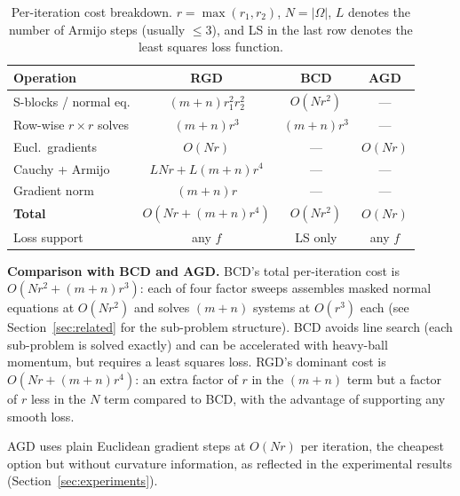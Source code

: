 \documentclass[letterpaper, 10 pt, conference]{ieeeconf}
\theoremstyle{plain}
\theoremstyle{definition}
\theoremstyle{remark}
\begin{document}
\begin{table}[t]
\centering
\caption{Per-iteration cost breakdown.  $r = \max(r_1,r_2)$, $N = |\Omega|$, $L$ denotes the number of Armijo steps (usually ${\leq}3$), and LS in the last row denotes the least squares loss function.
}
\label{tab:complexity}
\small
\begin{tabular}{@{}lccc@{}}
\toprule
Operation & RGD & BCD & AGD \\
\midrule
S-blocks / normal eq. & $(m{+}n)r_1^2 r_2^2$ & $O(Nr^2)$ & --- \\
Row-wise $r{\times}r$ solves & $(m{+}n)r^3$ & $(m{+}n)r^3$ & --- \\
Eucl.\ gradients & $O(Nr)$ & --- & $O(Nr)$ \\
Cauchy + Armijo & $LNr {+} L(m{+}n)r^4$ & --- & --- \\
Gradient norm & $(m{+}n)r$ & --- & --- \\
\midrule
\textbf{Total} & $O(Nr {+} (m{+}n)r^4)$ & $O(Nr^2)$ & $O(Nr)$ \\
\midrule
Loss support & any $f$ & LS only & any $f$ \\
\bottomrule
\end{tabular}
\end{table}



\noindent\textbf{Comparison with BCD and AGD.}
BCD's total per-iteration cost is $O(Nr^2 + (m{+}n)r^3)$: each of four factor sweeps assembles masked normal equations at $O(Nr^2)$ and solves $(m{+}n)$ systems at $O(r^3)$ each (see Section~\ref{sec:related} for the sub-problem structure). BCD avoids line search (each sub-problem is solved exactly) and can be accelerated with heavy-ball momentum, but requires a least squares loss. 
RGD's dominant cost is $O(Nr + (m{+}n)r^4)$: an extra factor of $r$ in the $(m{+}n)$ term but a factor of $r$ less in the $N$ term compared to BCD, with the advantage of supporting any smooth loss.

AGD uses plain Euclidean gradient steps at $O(Nr)$ per iteration, the cheapest option but without curvature information, as reflected in the experimental results (Section~\ref{sec:experiments}).

\end{document}

